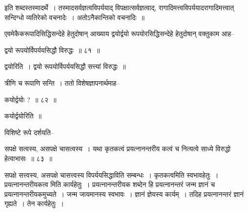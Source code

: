 \documentclass[article,12pt,a4paper]{memoir}
\begin{document}
	  \pstart इति शब्दस्तस्मादर्थे । तस्मादसर्वज्ञत्वविपर्ययाद् विपक्षात्सर्वज्ञत्वाद्, रागादिमत्त्वविपर्ययादरागादिमत्त्वात् सन्दिग्धो व्यतिरेको वचनादेः । अतोऽनैकान्तिको वचनादिः ॥
	\pend
        

	  \pstart एवमेकैकरूपादिसिद्धिसन्देहे हेतुदोषान् आख्याय द्वयोर्द्वयो रूपयोरसिद्धिसन्देहे हेतुदोषान् वक्तुकाम आह--
	\pend
        
	  \bigskip
	  \begingroup
	

	  \pstart द्वयो रूपयोर्विपर्ययसिद्धौ विरुद्धः ॥ ८१ ॥
	\pend
      
	  \endgroup
	 

	  \pstart द्वयोरिति । द्वयो रूपयोर्विपर्ययसिद्धौ सत्त्यां विरुद्धः ॥
	\pend
        

	  \pstart त्रीणि च रूपाणि सन्ति । ततो विशेषज्ञापनार्थमाह--
	\pend
        
	  \bigskip
	  \begingroup
	

	  \pstart कयोर्द्वयोः ? ॥ ८२ ॥
	\pend
      
	  \endgroup
	 

	  \pstart कयोर्द्वयोरिति ॥
	\pend
        

	  \pstart विशिष्टे रूपे दर्शयति--
	\pend
        
	  \bigskip
	  \begingroup
	

	  \pstart सपक्षे सत्वस्य, असपक्षे चासत्वस्य । यथा कृतकत्वं प्रयत्नानन्तरीय कत्वं च नित्यत्वे साध्ये विरुद्धो हेत्वाभासः ॥ ८३ ॥
	\pend
      
	  \endgroup
	 

	  \pstart सपक्षे सत्त्वस्य, असपक्षे चासत्त्वस्य विपर्ययसिद्धाविति सम्बन्धः । कृतकत्वमिति स्वभावहेतुः । प्रयत्नानन्तरीयकत्व मिति कार्यहेतुः । प्रयत्नानन्तरीयक शब्देन हि प्रयत्नानन्तरं जन्म ज्ञानं च प्रयत्नानन्तरीयकमुच्यते । जन्म जायमानस्य स्वभावः । ज्ञानं ज्ञेयस्य कार्यम् । तदिह प्रयत्नानन्तरं ज्ञानं गृह्यते । तेन कार्यहेतुः ।
	\pend
      
\end{document}
